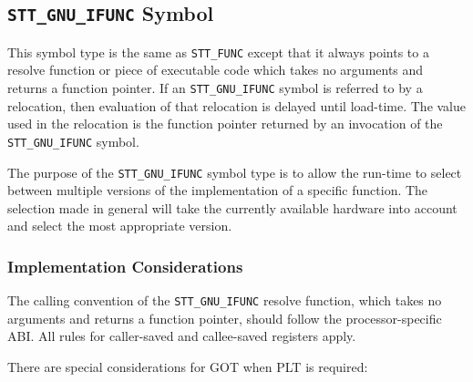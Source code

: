 \subsection{\texttt{STT_GNU_IFUNC} Symbol}

This symbol type is the same as \texttt{STT_FUNC} except that it always
points to a resolve function or piece of executable code which takes
no arguments and returns a function pointer.  If an \texttt{STT_GNU_IFUNC}
symbol is referred to by a relocation, then evaluation of that relocation
is delayed until load-time.  The value used in the relocation is the
function pointer returned by an invocation of the \texttt{STT_GNU_IFUNC}
symbol.

The purpose of the \texttt{STT_GNU_IFUNC} symbol type is to allow the
run-time to select between multiple versions of the implementation of
a specific function.  The selection made in general will take the
currently available hardware into account and select the most
appropriate version.

\subsubsection{Implementation Considerations}

The calling convention of the \texttt{STT_GNU_IFUNC} resolve
function, which takes no arguments and returns a function pointer,
should follow the processor-specific ABI. All rules for caller-saved
and callee-saved registers apply.

There are special considerations for GOT when PLT is required:

